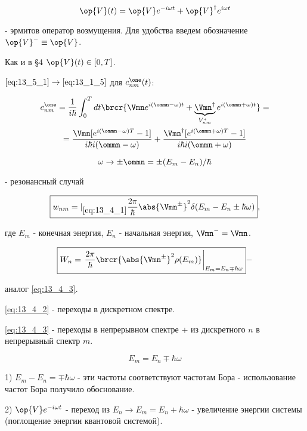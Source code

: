 \begin{equation}
\label{eq:13_5_1}
\op{V}(t) = \op{V}e^{-i\omega t} + \op{V}^\dag e^{i\omega t} 
\end{equation}

- эрмитов оператор возмущения. Для удобства введем обозначение $\op{V}^- \equiv \op{V}$.

Как и в \S 4 $\op{V}(t) \in [0, T]$.

$\eqref{eq:13_5_1} \to \eqref{eq:13_1_5}$ для $c_{nm}^\one (t)$:

\begin{gather*}
c_{nm}^\one = \frac{1}{i \hbar} \int_0^T dt \brcr{\Vmn e^{i(\ommn - \omega)t} + \underbrace{\Vmn^\dag}_{V_{nm}^*} e^{i(\ommn + \omega)t}} = \\
= \frac{\Vmn [e^{i(\ommn - \omega)T} - 1]}{i \hbar i (\ommn - \omega)} + \frac{\Vmn^\dag [e^{i(\ommn + \omega)T} - 1]}{i \hbar i (\ommn + \omega)}
\end{gather*}

$$
\omega \to \pm \ommn = \pm (E_m - E_n) / \hbar 
$$

- резонансный случай

\begin{equation}
\label{eq:13_5_2}
\boxed{w_{nm} =|_{\eqref{eq:13_4_1}} \frac{2\pi}{\hbar} \abs{\Vmn^\pm}^2 \delta(E_m - E_n \pm \hbar \omega)}, 
\end{equation}

где $E_m$ - конечная энергия, $E_n$ - начальная энергия, $\Vmn^- = \Vmn$.

\begin{equation}
\label{eq:13_5_3}
\boxed{W_n = \left .\frac{2\pi}{\hbar} \brcr{\abs{\Vmn^\pm}^2 \rho(E_m)} \right |_{E_m = E_n \mp \hbar \omega}} - 
\end{equation}

аналог \eqref{eq:13_4_3}.

\eqref{eq:13_4_2} - переходы в дискретном спектре.

\eqref{eq:13_4_3} - переходы в непрерывном спектре + из дискретного $n$ в непрерывный спектр $m$.

$$
E_m = E_n \mp \hbar \omega
$$

1) $E_m - E_n = \mp \hbar \omega$ - эти частоты соответствуют частотам Бора - использование частот Бора получило обоснование.

2) $\op{V} e^{-i \omega t}$ - переход из  $E_n \to E_m = E_n + \hbar \omega$ - увеличение энергии системы (поглощение энергии квантовой системой).